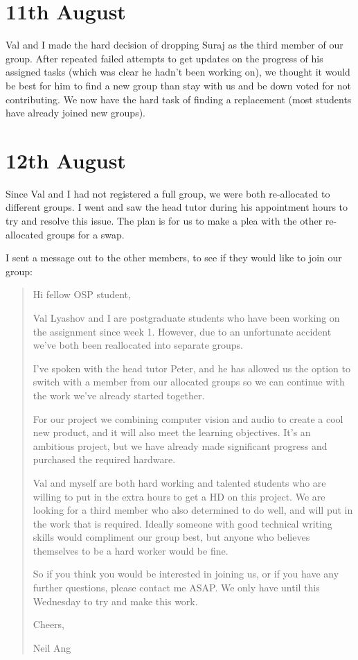\section*{11th August}

Val and I made the hard decision of dropping Suraj as the third member of our group. After repeated failed attempts to get updates on the progress of his assigned tasks (which was clear he hadn't been working on), we thought it would be best for him to find a new group than stay with us and be down voted for not contributing. We now have the hard task of finding a replacement (most students have already joined new groups).


\section*{12th August}

Since Val and I had not registered a full group, we were both re-allocated to different groups. I went and saw the head tutor during his appointment hours to try and resolve this issue. The plan is for us to make a plea with the other re-allocated groups for a swap.

I sent a message out to the other members, to see if they would like to join our group:

\blockquote{
Hi fellow OSP student,

Val Lyashov and I are postgraduate students who have been working on the assignment since week 1. However, due to an unfortunate accident we've both been reallocated into separate groups.

I've spoken with the head tutor Peter, and he has allowed us the option to switch with a member from our allocated groups so we can continue with the work we've already started together.

For our project we combining computer vision and audio to create a cool new product, and it will also meet the learning objectives. It's an ambitious project, but we have already made significant progress and purchased the required hardware.

Val and myself are both hard working and talented students who are willing to put in the extra hours to get a HD on this project. We are looking for a third member who also determined to do well, and will put in the work that is required. Ideally someone with good technical writing skills would compliment our group best, but anyone who believes themselves to be a hard worker would be fine.

So if you think you would be interested in joining us, or if you have any further questions, please contact me ASAP. We only have until this Wednesday to try and make this work.

Cheers,

Neil Ang
}

